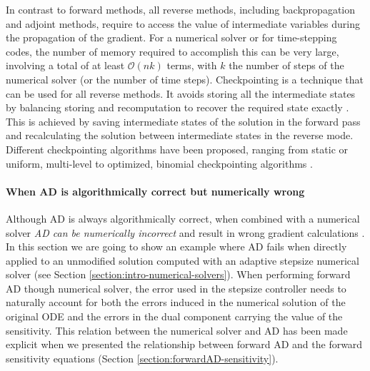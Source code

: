 In contrast to forward methods, all reverse methods, including backpropagation and adjoint methods, require to access the value of intermediate variables during the propagation of the gradient. 
For a numerical solver or for time-stepping codes, the number of memory required to accomplish this can be very large, involving a total of at least $\mathcal O(nk)$ terms, with $k$ the number of steps of the numerical solver (or the number of time steps). 
Checkpointing is a technique that can be used for all reverse methods. 
It avoids storing all the intermediate states by balancing  storing and recomputation to recover the required state exactly \cite{Griewank:2008kh}.
This is achieved by saving intermediate states of the solution in the forward pass and recalculating the solution between intermediate states in the reverse mode. 
Different checkpointing algorithms have been proposed, ranging from static or uniform, multi-level \cite{Giering_Kaminski_1998,Heimbach.2005} to optimized, binomial checkpointing algorithms  \cite{Griewank.2000,Walther.2004,Bockhorn.2020,Checkpoiting_2023}.


\paragraph{When AD is algorithmically correct but numerically wrong}
\label{section:AD-incorrect}


Although AD is always algorithmically correct, when combined with a numerical solver \textit{AD can be numerically incorrect} and result in wrong gradient calculations \cite{Eberhard_Bischof_1996}. 
In this section we are going to show an example where AD fails when directly applied to an unmodified solution computed with an adaptive stepsize numerical solver (see Section \ref{section:intro-numerical-solvers}).
When performing forward AD though numerical solver, the error used in the stepsize controller needs to naturally account for both the errors induced in the numerical solution of the original ODE and the errors in the dual component carrying the value of the sensitivity. 
This relation between the numerical solver and AD has been made explicit when we presented the relationship between forward AD and the forward sensitivity equations (Section \ref{section:forwardAD-sensitivity}). 

